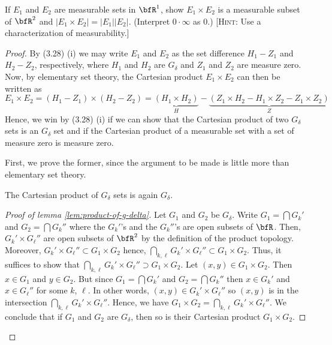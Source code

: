 
\begin{problem}
If $E_1$ and $E_2$ are measurable sets in $\bfR^1$, show $E_1\times E_2$ is
a measurable subset of $\bfR^2$ and $\left|E_1\times
  E_2\right|=\left|E_1\right|\left|E_2\right|$. (Interpret $0\cdot\infty$
as $0$.) [\textsc{Hint:} Use a characterization of measurability.]
\end{problem}
\begin{proof}
By (3.28) (i) we may write $E_1$ and $E_2$ as the set difference $H_1\minus
Z_1$ and $H_2\minus Z_2$, respectively, where $H_1$ and $H_2$ are $G_\delta$
and $Z_1$ and $Z_2$ are measure zero. Now, by elementary set theory, the
Cartesian product $E_1\times E_2$ can then be written as
\begin{equation}
\label{eq:1}
E_1\times E_2
=\left(H_1\minus Z_1\right)\times\left(H_2\minus Z_2\right)
=\underbrace{\left(H_1\times H_2\right)}_H\minus
\underbrace{\left(Z_1\times H_2\minus H_1\times Z_2\minus Z_1\times Z_2\right)}_Z
\end{equation}
Hence, we win by (3.28) (i) if we can show that the Cartesian product of two
$G_\delta$ sets is an $G_\delta$ set and if the Cartesian product of a
measurable set with a set of measure zero is measure zero.

First, we prove the former, since the argument to be made is little more
than elementary set theory.
\begin{lemma}
\label{lem:product-of-g-delta}
The Cartesian product of $G_\delta$ sets is again $G_\delta$.
\end{lemma}
\begin{proof}[Proof of lemma \ref{lem:product-of-g-delta}]
\renewcommand\qedsymbol{$\clubsuit$}
Let $G_1$ and $G_2$ be $G_\delta$. Write
$G_1=\bigcap G_k'$ and $G_2=\bigcap G_k''$ where the $G_k'$'s and the
$G_k''$'s are open subsets of $\bfR$. Then, $G_k'\times G_\ell''$ are
open subsets of $\bfR^2$ by the definition of the product
topology. Moreover, $G_k'\times G_\ell''\subset G_1\times G_2$ hence,
$\bigcap_{k,\ell} G_k'\times G_\ell''\subset G_1\times G_2$. Thus, it
suffices to show that
$\bigcap_{k,\ell} G_k'\times G_\ell''\supset G_1\times G_2$. Let
$(x,y)\in G_1\times G_2$. Then $x\in G_1$ and $y\in G_2$. But since
$G_1=\bigcap G_k'$ and $G_2=\bigcap G_k''$ then $x\in G_k'$ and
$x\in G_\ell''$ for some $k$, $\ell$. In other words,
$(x,y)\in G_k'\times G_\ell''$ so $(x,y)$ is in the intersection
$\bigcap_{k,\ell}G_k'\times G_\ell''$. Hence, we have
$G_1\times G_2=\bigcap_{k,\ell} G_k'\times G_\ell''$. We conclude that if
$G_1$ and $G_2$ are $G_\delta$, then so is their Cartesian product
$G_1\times G_2$.
\end{proof}


\end{proof}
